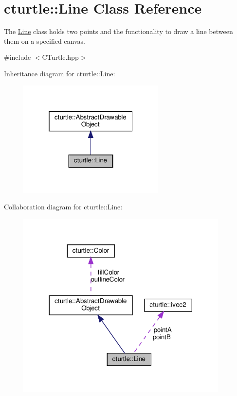 \hypertarget{classcturtle_1_1Line}{}\section{cturtle\+:\+:Line Class Reference}
\label{classcturtle_1_1Line}


The \hyperlink{classcturtle_1_1Line}{Line} class holds two points and the functionality to draw a line between them on a specified canvas.  




{\ttfamily \#include $<$C\+Turtle.\+hpp$>$}



Inheritance diagram for cturtle\+:\+:Line\+:
\nopagebreak
\begin{figure}[H]
\begin{center}
\leavevmode
\includegraphics[width=208pt]{classcturtle_1_1Line__inherit__graph}
\end{center}
\end{figure}


Collaboration diagram for cturtle\+:\+:Line\+:
\nopagebreak
\begin{figure}[H]
\begin{center}
\leavevmode
\includegraphics[width=300pt]{classcturtle_1_1Line__coll__graph}
\end{center}
\end{figure}
